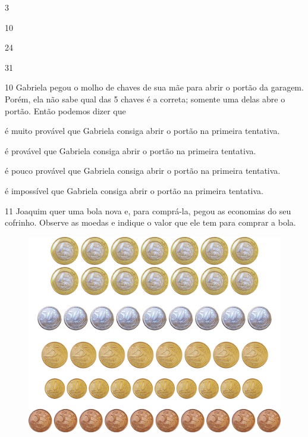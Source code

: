\begin{escolha}[itemsep=-5pt]
\item 3

\item 10

\item 24

\item 31
\end{escolha}

\num{10} Gabriela pegou o molho de chaves de sua mãe para abrir o portão da
garagem. Porém, ela não sabe qual das 5 chaves é a correta; somente uma
delas abre o portão. Então podemos dizer que

\begin{escolha}[itemsep=-5pt]
\item é muito provável que Gabriela consiga abrir o portão na primeira tentativa.

\item é provável que Gabriela consiga abrir o portão na primeira tentativa.

\item é pouco provável que Gabriela consiga abrir o portão na primeira tentativa.

\item é impossível que Gabriela consiga abrir o portão na primeira tentativa.
\end{escolha}

\num{11} Joaquim quer uma bola nova e, para comprá-la, pegou as economias do
seu cofrinho. Observe as moedas e indique o valor que ele tem para comprar a bola.

\begin{figure}[H]
\centering
\includegraphics[width=.8\textwidth]{./media/image120.png}
\end{figure}

